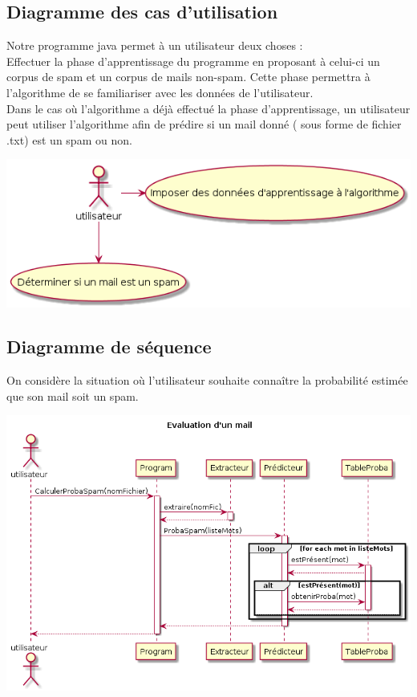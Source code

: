 \documentclass{article}
\begin{document}
\subsection{Diagramme des cas d'utilisation}
Notre programme java permet à un utilisateur deux choses :\\ Effectuer la phase d'apprentissage du programme en proposant à celui-ci un corpus de spam et un corpus de mails non-spam. Cette phase permettra à l'algorithme de se familiariser avec les données de l'utilisateur. \\
Dans le cas où l'algorithme a déjà effectué la phase d'apprentissage, un utilisateur peut
utiliser l'algorithme afin de prédire si un mail donné ( sous forme de fichier .txt) est un spam ou non.

\includegraphics[scale=0.6]{diag_usecase.png}

\subsection{Diagramme de séquence}
On considère la situation où l'utilisateur souhaite connaître la probabilité estimée que son mail soit un spam.

\includegraphics[scale=0.5]{diag_sequence_prediction.png}
\end{document}
